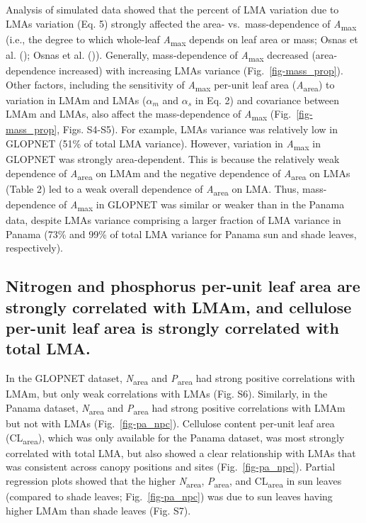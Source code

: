 \documentclass[
  12pt,
  letterpaper,
  DIV=11,
  numbers=noendperiod]{scrartcl}
\begin{document}
Analysis of simulated data showed that the percent of LMA variation due
to LMAs variation (Eq. 5) strongly affected the area-
vs.~mass-dependence of \emph{A}\textsubscript{max} (i.e., the degree to
which whole-leaf \emph{A}\textsubscript{max} depends on leaf area or
mass; Osnas et al. (); Osnas et al.
()). Generally, mass-dependence of
\emph{A}\textsubscript{max} decreased (area-dependence increased) with
increasing LMAs variance (Fig.~\ref{fig-mass_prop}). Other factors,
including the sensitivity of \emph{A}\textsubscript{max} per-unit leaf
area (\emph{A}\textsubscript{area}) to variation in LMAm and LMAs
(\(\alpha_m\) and \(\alpha_s\) in Eq. 2) and covariance between LMAm and
LMAs, also affect the mass-dependence of \emph{A}\textsubscript{max}
(Fig.~\ref{fig-mass_prop}, Figs. S4-S5). For example, LMAs variance was
relatively low in GLOPNET (51\% of total LMA variance). However,
variation in \emph{A}\textsubscript{max} in GLOPNET was strongly
area-dependent. This is because the relatively weak dependence of
\emph{A}\textsubscript{area} on LMAm and the negative dependence of
\emph{A}\textsubscript{area} on LMAs (Table 2) led to a weak overall
dependence of \emph{A}\textsubscript{area} on LMA. Thus, mass-dependence
of \emph{A}\textsubscript{max} in GLOPNET was similar or weaker than in
the Panama data, despite LMAs variance comprising a larger fraction of
LMA variance in Panama (73\% and 99\% of total LMA variance for Panama
sun and shade leaves, respectively).

\subsection{Nitrogen and phosphorus per-unit leaf area are strongly
correlated with LMAm, and cellulose per-unit leaf area is strongly
correlated with total
LMA.}\label{nitrogen-and-phosphorus-per-unit-leaf-area-are-strongly-correlated-with-lmam-and-cellulose-per-unit-leaf-area-is-strongly-correlated-with-total-lma.}

In the GLOPNET dataset, \emph{N}\textsubscript{area} and
\emph{P}\textsubscript{area} had strong positive correlations with LMAm,
but only weak correlations with LMAs (Fig. S6). Similarly, in the Panama
dataset, \emph{N}\textsubscript{area} and \emph{P}\textsubscript{area}
had strong positive correlations with LMAm but not with LMAs
(Fig.~\ref{fig-pa_npc}). Cellulose content per-unit leaf area
(CL\textsubscript{area}), which was only available for the Panama
dataset, was most strongly correlated with total LMA, but also showed a
clear relationship with LMAs that was consistent across canopy positions
and sites (Fig.~\ref{fig-pa_npc}). Partial regression plots showed that
the higher \emph{N}\textsubscript{area}, \emph{P}\textsubscript{area},
and CL\textsubscript{area} in sun leaves (compared to shade leaves;
Fig.~\ref{fig-pa_npc}) was due to sun leaves having higher LMAm than
shade leaves (Fig. S7).
\end{document}
